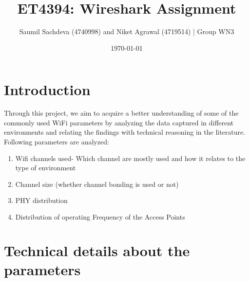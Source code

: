 \documentclass{article}
\begin{document}
\title{ET4394: Wireshark Assignment}

\author{Saumil Sachdeva (4740998) and Niket Agrawal (4719514) | Group WN3
}
\date{\today}

\maketitle

\section{Introduction}

Through this project, we aim to acquire a better understanding of some of the commonly used WiFi parameters by analyzing the data captured in different environments and relating the findings with technical reasoning in the literature. 
Following parameters are analyzed:
\begin{enumerate}
    \item Wifi channels used- Which channel are mostly used and how it relates to the type of environment
    \item Channel size (whether channel bonding is used or not)
    \item PHY distribution
    \item Distribution of operating Frequency of the Access Points
\end{enumerate}


\section{Technical details about the parameters}
\end{document}
